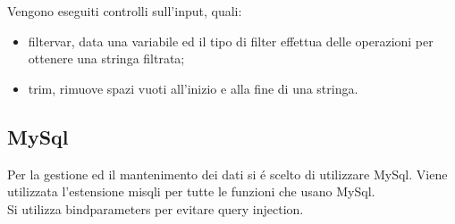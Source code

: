   Vengono eseguiti controlli sull'input, quali:
  \begin{itemize}
    \item filter\textunderscore var, data una variabile ed il tipo di filter effettua delle operazioni per ottenere una stringa filtrata;
    \item trim, rimuove spazi vuoti all'inizio e alla fine di una stringa.
  \end{itemize}

  \subsection{MySql}
  Per la gestione ed il mantenimento dei dati si é scelto di utilizzare MySql. Viene utilizzata l'estensione misqli per tutte le funzioni che usano MySql. \\
  Si utilizza bind\textunderscore parameters per evitare query injection.